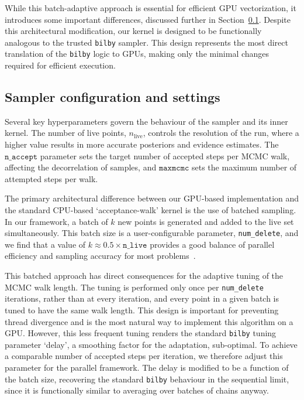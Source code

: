 \documentclass[fleqn,usenatbib]{mnras}
\begin{document}
While this batch-adaptive approach is essential for efficient GPU
vectorization, it introduces some important differences, discussed further in Section~\ref{sec:sampler_config}.
Despite this architectural modification, our kernel is designed to be functionally
analogous to the trusted \texttt{bilby} sampler. This design
represents the most direct translation of the \texttt{bilby} logic
to GPUs, making only the minimal changes required for efficient execution. 

\subsection{Sampler configuration and settings}
\label{sec:sampler_config}

Several key hyperparameters govern the behaviour of the sampler and its
inner kernel. The number of live points, \mbox{$n_{\text{live}}$}, controls the
resolution of the run, where a higher value results in more accurate
posteriors and evidence estimates. The \mbox{$\texttt{n\_accept}$}
parameter sets the target number of accepted steps per MCMC walk,
affecting the decorrelation of samples, and \mbox{$\texttt{maxmcmc}$}
sets the maximum number of attempted steps per walk.

The primary architectural difference between our GPU-based implementation
and the standard CPU-based `acceptance-walk' kernel is the use of
batched sampling. In our framework, a batch of $k$ new points is
generated and added to the live set simultaneously. This batch size is
a user-configurable parameter, \texttt{num\_delete}, and we find that a
value of \mbox{$k \approx 0.5 \times \texttt{n\_live}$} provides a good balance
of parallel efficiency and sampling accuracy for most problems~\citep{yallup2025nested}.


This batched approach has direct consequences for the adaptive tuning of
the MCMC walk length. The tuning is performed only once per \texttt{num\_delete} iterations, 
rather than at every iteration, and every point in a given batch is tuned to have the same walk length.
This design is important for preventing thread divergence and is the 
most natural way to implement this algorithm on a GPU.
However, this less frequent tuning renders the standard \texttt{bilby}
tuning parameter `delay', a smoothing factor for
the adaptation, sub-optimal. 
To achieve a comparable number of accepted steps per
iteration, we therefore adjust this parameter for the parallel
framework. The delay is modified to be a function of the batch size,
recovering the standard \texttt{bilby} behaviour in the sequential
limit, since it is functionally similar to averaging over batches of chains
anyway. 
\end{document}
